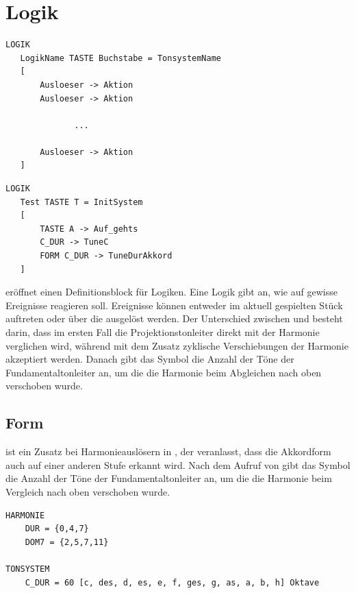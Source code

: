 \section{Logik}
\label{sec:SX_LOGIC}



\begin{verbatim}
LOGIK
   LogikName TASTE Buchstabe = TonsystemName
   [
       Ausloeser -> Aktion
       Ausloeser -> Aktion

              ...

       Ausloeser -> Aktion
   ]
\end{verbatim}




\begin{verbatim}
LOGIK 
   Test TASTE T = InitSystem
   [
       TASTE A -> Auf_gehts
       C_DUR -> TuneC 
       FORM C_DUR -> TuneDurAkkord 
   ]
\end{verbatim}




 eröffnet einen Definitionsblock für Logiken. Eine
Logik gibt an, wie \mutabor{} auf gewisse Ereignisse reagieren soll.
Ereignisse können entweder im aktuell gespielten Stück auftreten oder
über die  ausgelöst werden. Der
Unterschied zwischen  und  besteht
darin, dass im ersten Fall die Projektionstonleiter direkt mit der
Harmonie verglichen wird, während mit dem Zusatz
 zyklische Verschiebungen der
Harmonie akzeptiert werden. Danach gibt das Symbol 
die Anzahl der Töne der Fundamentaltonleiter an, um die die Harmonie
beim Abgleichen nach oben verschoben wurde.


\subsection{Form}
\label{sec:SX_SHIFTED}

 ist ein Zusatz bei Harmonieauslösern in
, der veranlasst, dass die Akkordform
auch auf einer anderen Stufe erkannt wird. Nach dem Aufruf von
 gibt das Symbol  die Anzahl der Töne
der Fundamentaltonleiter an, um die die Harmonie beim Vergleich nach
oben verschoben wurde.




\begin{verbatim}
HARMONIE  
    DUR = {0,4,7}  
    DOM7 = {2,5,7,11}

TONSYSTEM  
    C_DUR = 60 [c, des, d, es, e, f, ges, g, as, a, b, h] Oktave
\end{verbatim}



